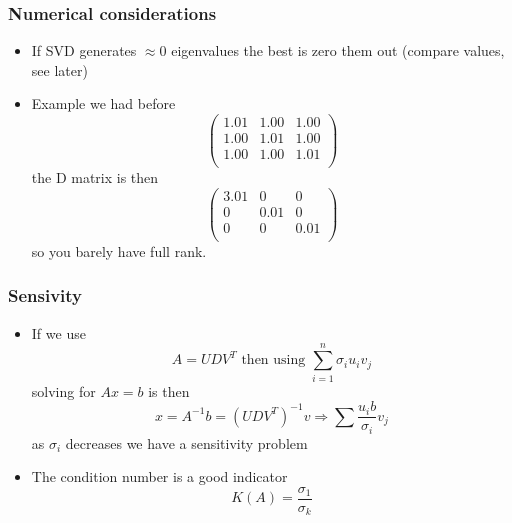 \documentclass[10pt]{beamer}
\begin{document}
\begin{frame}
  \frametitle{Numerical considerations}
  \begin{itemize}
  \item If SVD generates $\approx 0$ eigenvalues the best is zero them
    out (compare values, see later)
  \item Example we had before
    \[
      \left(
        \begin{array}{ccc}
          1.01 & 1.00 & 1.00 \\
          1.00 & 1.01 & 1.00 \\
          1.00 & 1.00 & 1.01 \\ 
        \end{array}\right)
    \]
    the D matrix is then
    \[
      \left(
        \begin{array}{ccc}
          3.01& 0 & 0 \\
          0& 0.01 & 0 \\
          0 & 0 & 0.01\\ 
        \end{array}\right) 
    \]
    so you barely have full rank. 
  \end{itemize}
\end{frame}

\begin{frame}
  \frametitle{Sensivity}
  \begin{itemize}
  \item If we use
    \[
      A = U D V^T \mbox{ then using } \sum_{i=1}^n \sigma_i u_i v_j
    \]
    solving for $A x = b$ is then
    \[
      x = A^{-1} b = (UDV^T)^{-1} v \Rightarrow \sum \frac{u_i b}{\sigma_i}v_j
    \]
    as $\sigma_i$ decreases we have a sensitivity problem
  \item The condition number is a good indicator
    \[
      K(A) = \frac{\sigma_1}{\sigma_k}
    \]
  \end{itemize}
\end{frame}
\end{document}
